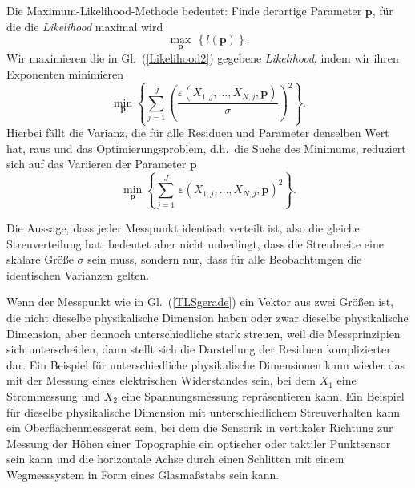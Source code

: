 Die Maximum-Likelihood-Methode bedeutet: Finde derartige Parameter $\mathbf{p}$, für die
die \textsl{Likelihood} maximal wird
\begin{equation}
\max_{\mathbf{p}} \, \left\{ l(\mathbf{p}) \right\}.
\end{equation}
Wir maximieren die in Gl.~(\ref{Likelihood2}) gegebene \textsl{Likelihood}, indem wir
ihren Exponenten minimieren
\begin{equation}
\min_{\mathbf{p}}\left\{ \sum\limits_{j = 1}^J \left(\frac{\varepsilon(X_{1,j},\dots,X_{N,j},\mathbf{p})}{\sigma}\right)^2  \right\}.
\end{equation}
Hierbei fällt die Varianz, die für alle Residuen und Parameter denselben Wert hat, raus und
das Optimierungsproblem, d.h.\ die Suche des Minimums, reduziert sich
auf das Variieren der Parameter $\mathbf{p}$
\begin{equation}
\min_{\mathbf{p}} \left\{ \sum\limits_{j = 1}^J \, \varepsilon(X_{1,j},\dots,X_{N,j},\mathbf{p})^2  \right\} .
\end{equation}

Die Aussage, dass jeder Messpunkt identisch verteilt ist, also die gleiche Streuverteilung hat,
bedeutet aber nicht unbedingt, dass die Streubreite eine skalare Größe $\sigma$ sein muss,
sondern nur, dass für alle Beobachtungen die identischen Varianzen gelten.

Wenn der Messpunkt wie in Gl.~(\ref{TLSgerade}) ein Vektor aus zwei Größen ist, die nicht
dieselbe physikalische Dimension haben oder zwar dieselbe physikalische Dimension, aber dennoch
unterschiedliche stark streuen, weil die Messprinzipien sich unterscheiden, dann stellt sich
die Darstellung der Residuen komplizierter dar. Ein Beispiel für unterschiedliche physikalische
Dimensionen kann wieder das mit der Messung eines elektrischen Widerstandes sein, bei dem $X_1$ eine
Strommessung und $X_2$ eine Spannungsmessung repräsentieren kann.
Ein Beispiel für dieselbe physikalische Dimension mit unterschiedlichem Streuverhalten kann ein
Oberflächenmessgerät sein, bei dem die Sensorik in vertikaler Richtung zur Messung der Höhen einer
Topographie ein optischer oder taktiler Punktsensor sein kann und die horizontale Achse durch einen
Schlitten mit einem Wegmesssystem in Form eines Glasmaßstabs sein kann.

